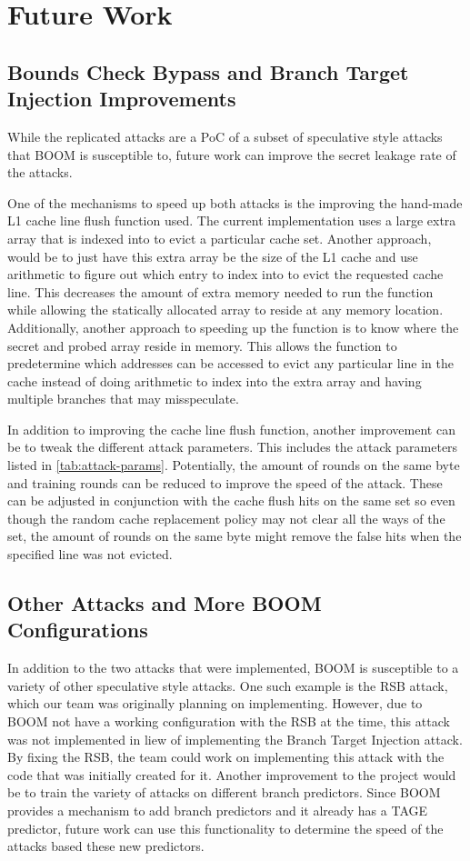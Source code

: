 \section{Future Work}

\subsection{Bounds Check Bypass and Branch Target Injection Improvements}

While the replicated attacks are a PoC of a subset of speculative style attacks that BOOM
is susceptible to, future work can improve the secret leakage rate of the attacks.

One of the mechanisms to speed up both attacks is the improving the hand-made L1 cache line flush function
used. The current implementation uses a large extra array that is indexed into to evict a particular
cache set. Another approach, would be to just have this extra array be the size of the L1 cache and use
arithmetic to figure out which entry to index into to evict the requested cache line. This decreases the
amount of extra memory needed to run the function while allowing the statically allocated array to reside
at any memory location. Additionally, another approach to speeding up the function is to know where the
secret and probed array reside in memory. This allows the function to predetermine which addresses can be 
accessed to evict any particular line in the cache instead of doing arithmetic to index into the extra array and
having multiple branches that may misspeculate.

In addition to improving the cache line flush function, another
improvement can be to tweak the different attack parameters. This includes
the attack parameters listed in \ref{tab:attack-params}. Potentially, the amount of rounds on the
same byte and training rounds can be reduced to improve the speed of the attack.
These can be adjusted in conjunction with the cache flush hits on the same set so even though the 
random cache replacement policy may not clear all the ways of the set, the amount of rounds on
the same byte might remove the false hits when the specified line was not evicted.

\subsection{Other Attacks and More BOOM Configurations}

In addition to the two attacks that were implemented, BOOM is susceptible to a variety of
other speculative style attacks. One such example is the RSB attack, which our team was 
originally planning on implementing. However, due to BOOM not have a working configuration
with the RSB at the time, this attack was not implemented in liew of implementing the Branch Target
Injection attack. By fixing the RSB, the team could work on implementing this attack with the 
code that was initially created for it. Another improvement to the project would be to train the
variety of attacks on different branch predictors. Since BOOM provides a mechanism to add branch 
predictors and it already has a TAGE predictor, future work can use this functionality to determine
the speed of the attacks based these new predictors.

